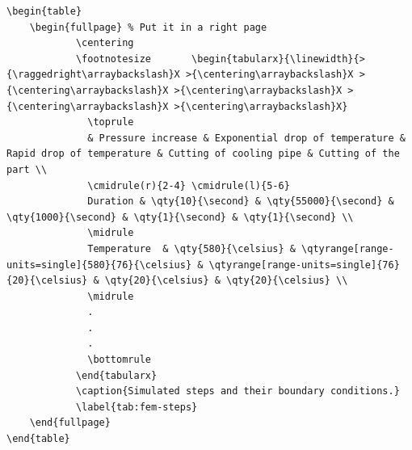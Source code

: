 \begin{lstlisting}[language={[LaTeX]TeX}]
\begin{table}
	\begin{fullpage} % Put it in a right page
			\centering
			\footnotesize 		\begin{tabularx}{\linewidth}{>{\raggedright\arraybackslash}X >{\centering\arraybackslash}X >{\centering\arraybackslash}X >{\centering\arraybackslash}X >{\centering\arraybackslash}X >{\centering\arraybackslash}X}
			  \toprule
			  & Pressure increase & Exponential drop of temperature & Rapid drop of temperature & Cutting of cooling pipe & Cutting of the part \\
			  \cmidrule(r){2-4} \cmidrule(l){5-6}
			  Duration & \qty{10}{\second} & \qty{55000}{\second} & \qty{1000}{\second} & \qty{1}{\second} & \qty{1}{\second} \\
			  \midrule
			  Temperature  & \qty{580}{\celsius} & \qtyrange[range-units=single]{580}{76}{\celsius} & \qtyrange[range-units=single]{76}{20}{\celsius} & \qty{20}{\celsius} & \qty{20}{\celsius} \\
			  \midrule
			  .
			  .
			  .
			  \bottomrule
			\end{tabularx}
			\caption{Simulated steps and their boundary conditions.}
			\label{tab:fem-steps}
	\end{fullpage}
\end{table}
\end{lstlisting}

